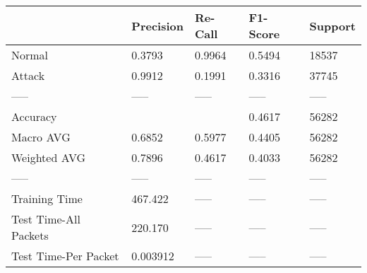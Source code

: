 \begin{tabular}{lllll}
\toprule
{} & Precision & Re-Call & F1-Score & Support \\
\midrule
Normal                &    0.3793 &  0.9964 &   0.5494 &   18537 \\
Attack                &    0.9912 &  0.1991 &   0.3316 &   37745 \\
-----                 &     ----- &   ----- &    ----- &   ----- \\
Accuracy              &           &         &   0.4617 &   56282 \\
Macro AVG             &    0.6852 &  0.5977 &   0.4405 &   56282 \\
Weighted AVG          &    0.7896 &  0.4617 &   0.4033 &   56282 \\
-----                 &     ----- &   ----- &    ----- &   ----- \\
Training Time         &   467.422 &   ----- &    ----- &   ----- \\
Test Time-All Packets &   220.170 &   ----- &    ----- &   ----- \\
Test Time-Per Packet  &  0.003912 &   ----- &    ----- &   ----- \\
\bottomrule
\end{tabular}
